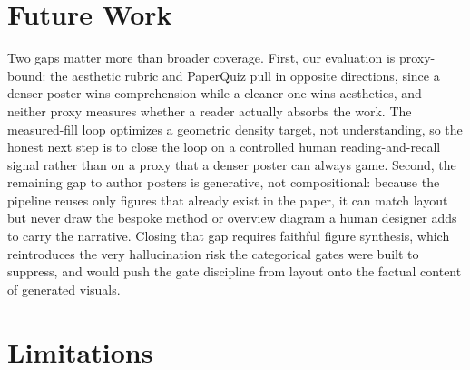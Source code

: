\documentclass{article}
\begin{document}
\section{Future Work}\label{sec:future}

Two gaps matter more than broader coverage. First, our evaluation is proxy-bound: the aesthetic rubric and PaperQuiz pull in opposite directions, since a denser poster wins comprehension while a cleaner one wins aesthetics, and neither proxy measures whether a reader actually absorbs the work. The measured-fill loop optimizes a geometric density target, not understanding, so the honest next step is to close the loop on a controlled human reading-and-recall signal rather than on a proxy that a denser poster can always game. Second, the remaining gap to author posters is generative, not compositional: because the pipeline reuses only figures that already exist in the paper, it can match layout but never draw the bespoke method or overview diagram a human designer adds to carry the narrative. Closing that gap requires faithful figure synthesis, which reintroduces the very hallucination risk the categorical gates were built to suppress, and would push the gate discipline from layout onto the factual content of generated visuals.




\clearpage
\appendix

\section{Limitations}\label{app:limit}
\end{document}
